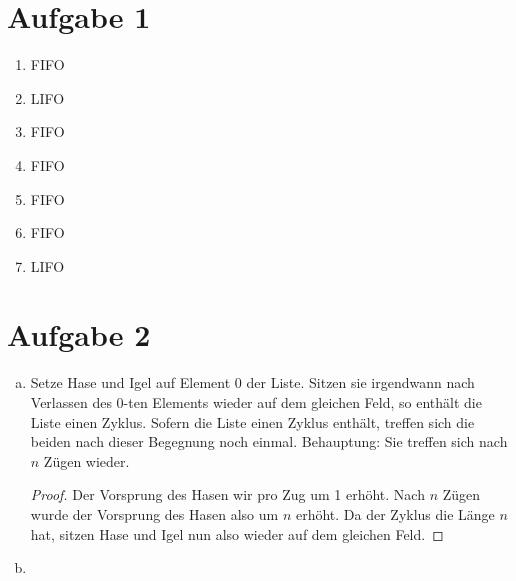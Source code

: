 \documentclass{article}
\begin{document}
\section*{Aufgabe 1}
    \begin{enumerate}
        \item FIFO
        \item LIFO
        \item FIFO
        \item FIFO
        \item FIFO
        \item FIFO
        \item LIFO
    \end{enumerate}
\section*{Aufgabe 2}
\begin{enumerate}[(a)]
    \item Setze Hase und Igel auf Element 0 der Liste. Sitzen sie irgendwann nach Verlassen des 0-ten Elements wieder auf dem gleichen Feld, so enthält die Liste einen Zyklus. Sofern die Liste einen Zyklus enthält, treffen sich die beiden nach dieser Begegnung noch einmal. Behauptung: Sie treffen sich nach $n$ Zügen wieder. 
    \begin{proof}
        Der Vorsprung des Hasen wir pro Zug um 1 erhöht. Nach $n$ Zügen wurde der Vorsprung des Hasen also um $n$ erhöht. Da der Zyklus die Länge $n$ hat, sitzen Hase und Igel nun also wieder auf dem gleichen Feld.
    \end{proof}
    \item 
\end{enumerate}
\end{document}

